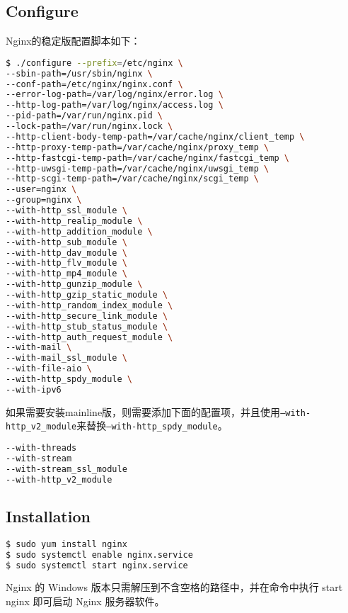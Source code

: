 \subsection{Configure}

Nginx的稳定版配置脚本如下：

\begin{lstlisting}[language=bash]
$ ./configure --prefix=/etc/nginx \
--sbin-path=/usr/sbin/nginx \
--conf-path=/etc/nginx/nginx.conf \
--error-log-path=/var/log/nginx/error.log \
--http-log-path=/var/log/nginx/access.log \
--pid-path=/var/run/nginx.pid \
--lock-path=/var/run/nginx.lock \
--http-client-body-temp-path=/var/cache/nginx/client_temp \
--http-proxy-temp-path=/var/cache/nginx/proxy_temp \
--http-fastcgi-temp-path=/var/cache/nginx/fastcgi_temp \
--http-uwsgi-temp-path=/var/cache/nginx/uwsgi_temp \
--http-scgi-temp-path=/var/cache/nginx/scgi_temp \
--user=nginx \
--group=nginx \
--with-http_ssl_module \
--with-http_realip_module \
--with-http_addition_module \
--with-http_sub_module \
--with-http_dav_module \
--with-http_flv_module \
--with-http_mp4_module \
--with-http_gunzip_module \
--with-http_gzip_static_module \
--with-http_random_index_module \
--with-http_secure_link_module \
--with-http_stub_status_module \
--with-http_auth_request_module \
--with-mail \
--with-mail_ssl_module \
--with-file-aio \
--with-http_spdy_module \
--with-ipv6
\end{lstlisting}

如果需要安装mainline版，则需要添加下面的配置项，并且使用\texttt{--with-http\_v2\_module}来替换\texttt{--with-http\_spdy\_module}。

\begin{lstlisting}[language=bash]
--with-threads
--with-stream
--with-stream_ssl_module
--with-http_v2_module
\end{lstlisting}


\subsection{Installation}


\begin{lstlisting}[language=bash]
$ sudo yum install nginx
$ sudo systemctl enable nginx.service
$ sudo systemctl start nginx.service
\end{lstlisting}



Nginx 的 Windows 版本只需解压到不含空格的路径中，并在命令中执行 start nginx 即可启动 Nginx 服务器软件。



